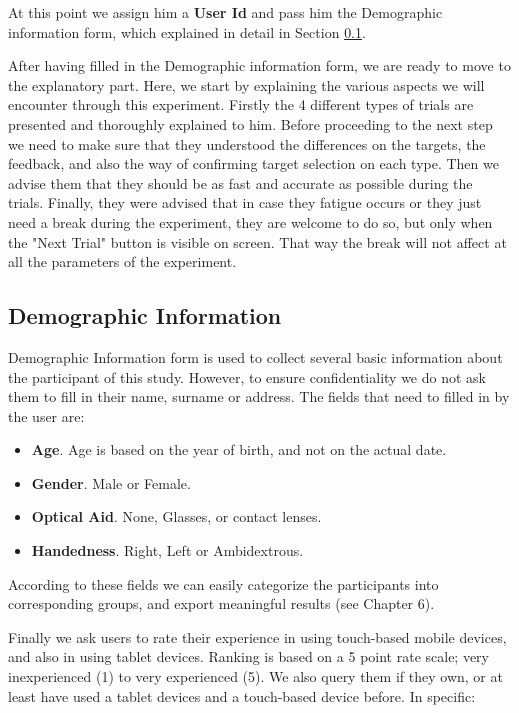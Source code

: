 At this point we assign him a \textbf{User Id} and pass him the Demographic information form, which explained in detail in Section \ref{sec:demographic}.

After having filled in the Demographic information form, we are ready to move to the explanatory part. Here, we start by explaining the various aspects we will encounter through this experiment. Firstly the 4 different types of trials are presented and thoroughly explained to him. Before proceeding to the next step we need to make sure that they understood the differences on the targets, the feedback, and also the way of confirming target selection on each type. Then we advise them that they should be as fast and accurate as possible during the trials. Finally, they were advised that in case they fatigue occurs or they just need a break during the experiment, they are welcome to do so, but only when the "Next Trial" button is visible on screen. That way the break will not affect at all the parameters of the experiment.




\subsection{Demographic Information}
\label{sec:demographic}

Demographic Information form is used to collect several basic information about the participant of this study. However, to ensure confidentiality we do not ask them to fill in their  name, surname or address. The fields that need to filled in by the user are:


\begin{itemize}
	\item \textbf{Age}. Age is based on the year of birth, and not on the actual date. 
	\item \textbf{Gender}. Male or Female.
	\item \textbf{Optical Aid}. None, Glasses, or contact lenses. 
	\item \textbf{Handedness}. Right, Left or Ambidextrous.
\end{itemize}

According to these fields we can easily categorize the participants into corresponding groups, and export meaningful results (see Chapter 6).

Finally we ask users to rate their experience in using touch-based mobile devices, and also in using tablet devices. Ranking is based on a 5 point rate scale; very inexperienced (1) to very experienced (5). We also query them if they own, or at least have used a tablet devices and a touch-based device before. In specific:

